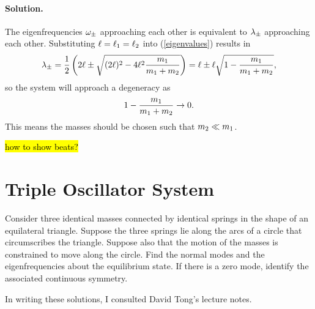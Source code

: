 \documentclass[11pt]{article}
\newcommand{\refeq}[1]{(\ref{#1})}
\newenvironment{statement}
{
    \color{darkgray}
    \ignorespaces
}
{
    \smallskip
}
\newenvironment{solution}
{
    \paragraph{Solution.}
    \ignorespaces
}
{
    \bigskip
}
\begin{document}
\begin{solution}
	The eigenfrequencies $\omega_\pm$ approaching each other is equivalent to $\lambda_\pm$ approaching each other.  Substituting $\ell = \ell_1 = \ell_2$ into \refeq{eigenvalues} results in
	\begin{equation} \label{eigenvalues}
		\lambda_\pm = \frac{1}{2} \left( 2 \ell \pm \sqrt{(2 \ell)^2 - 4 \ell^2 \frac{m_1}{m_1 + m_2}} \right) = \ell \pm \ell \sqrt{1 - \frac{m_1}{m_1 + m_2}},
	\end{equation}
	so the system will approach a degeneracy as
	\begin{equation}
		1 - \frac{m_1}{m_1 + m_2} \to 0.
	\end{equation}
	This means the masses should be chosen such that $m_2 \ll m_1$.
	
	\hl{how to show beats?}
\end{solution}


\section{Triple Oscillator System}
\begin{statement}
	Consider three identical masses connected by identical springs in the shape of an equilateral triangle.  Suppose the three springs lie along the arcs of a circle that circumscribes the triangle.  Suppose also that the motion of the masses is constrained to move along the circle.  Find the normal modes and the eigenfrequencies about the equilibrium state.  If there is a zero mode, identify the associated continuous symmetry.
\end{statement}

%

	
In writing these solutions, I consulted David Tong's lecture notes.
\end{document}
